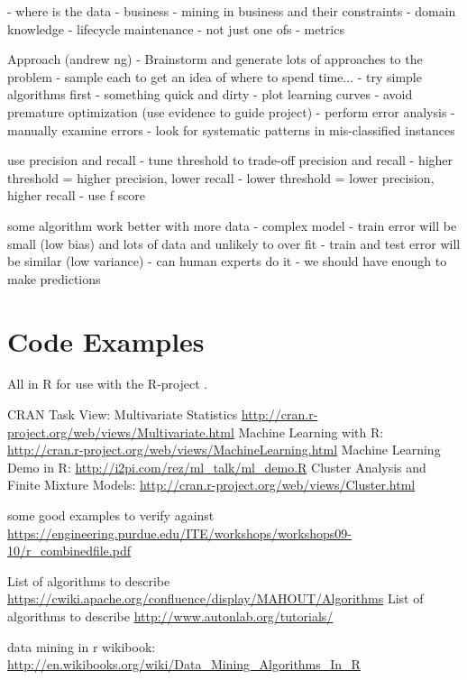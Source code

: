 \begin{bibunit}
- where is the data - business
- mining in business and their constraints
- domain knowledge
- lifecycle maintenance - not just one ofs
- metrics

Approach (andrew ng)
- Brainstorm and generate lots of approaches to the problem - sample each to get an idea of where to spend time...
- try simple algorithms first - something quick and dirty
- plot learning curves
	- avoid premature optimization (use evidence to guide project)
- perform error analysis
	- manually examine errors
	- look for systematic patterns in mis-classified instances

use precision and recall
- tune threshold to trade-off precision and recall
	- higher threshold = higher precision, lower recall
	- lower threshold = lower precision, higher recall
- use f score

some algorithm work better with more data
- complex model - train error will be small (low bias) and lots of data and unlikely to over fit - train and test error will be similar (low variance)
- can human experts do it - we should have enough to make predictions


\section{Code Examples}

All in R for use with the R-project \cite{RDevelopmentCoreTeam2011}.

CRAN Task View: Multivariate Statistics \url{http://cran.r-project.org/web/views/Multivariate.html}
Machine Learning with R: \url{http://cran.r-project.org/web/views/MachineLearning.html}
Machine Learning Demo in R: \url{http://i2pi.com/rez/ml_talk/ml_demo.R}
Cluster Analysis and Finite Mixture Models: \url{http://cran.r-project.org/web/views/Cluster.html}

some good examples to verify against \url{https://engineering.purdue.edu/ITE/workshops/workshops09-10/r_combinedfile.pdf}

List of algorithms to describe \url{https://cwiki.apache.org/confluence/display/MAHOUT/Algorithms}
List of algorithms to describe \url{http://www.autonlab.org/tutorials/}


data mining in r wikibook: \url{http://en.wikibooks.org/wiki/Data_Mining_Algorithms_In_R}

\renewcommand{\bibsection}{\section{\bibname}}
\putbib
\end{bibunit}
